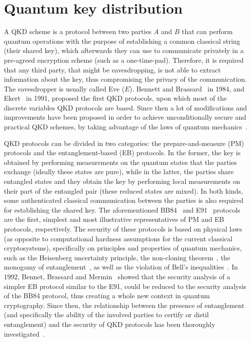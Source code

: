 \section{Quantum key distribution}

A QKD scheme is a protocol between two parties $A$ and $B$ that can perform quantum operations with the purpose of establishing a common classical string (their shared key), which afterwards they can use to communicate privately in a pre-agreed encryption scheme (such as a one-time-pad). Therefore, it is required that any third party, that might be eavesdropping, is not able to extract information about the key, thus compromising the privacy of the communication. The eavesdropper is usually called Eve ($E$). Bennett and Brassard~\cite{ben:bra:84} in 1984, and Ekert~\cite{eke:91} in 1991, proposed the first QKD protocols, upon which most of the discrete variables QKD protocols are based. Since then a lot of modifications and improvements have been proposed in order to achieve unconditionally secure and practical QKD schemes, by taking advantage of the laws of quantum mechanics~\cite{may:01,ren:05,sca:ren:08,tom:lev:17}. 

QKD protocols can be divided in two categories: the prepare-and-measure (PM) protocols and the entanglement-based (EB) protocols. In the former, the key is obtained by performing measurements on the quantum states that the parties exchange (ideally these states are pure), while in the latter, the parties share entangled states and they obtain the key by performing local measurements on their part of the entangled pair (these reduced states are mixed). In both kinds, some authenticated classical communication between the parties is also required for establishing the shared key. The aforementioned BB84~\cite{ben:bra:84} and E91~\cite{eke:91} protocols are the first, simplest and most illustrative representatives of PM and EB protocols, respectively. The security of these protocols is based on physical laws (as opposite to computational hardness assumptions for the current classical cryptosystems), specifically on principles and properties of quantum mechanics, such as the Heisenberg uncertainty principle, the non-cloning theorem~\cite{woo:zur:82}, the monogamy of entanglement~\cite{cof:kun:woo:00}, as well as the violation of Bell's inequalities~\cite{bel:64,chsh:ineq:69}. In 1992, Bennet, Brassard and Mermin~\cite{ben:bra:mer:92} showed that the security analysis of a simpler EB protocol similar to the E91, could be reduced to the security analysis of the BB84 protocol, thus creating a whole new context in quantum cryptography. Since then, the relationship between the presence of entanglement (and specifically the ability of the involved parties to certify or distil entanglement) and the security of QKD protocols has been thoroughly investigated~\cite{aci:mas:gis:03,cur:lew:lut:04,cur:guh:lew:lut:05,aci:gis:mas:06}.  
 



